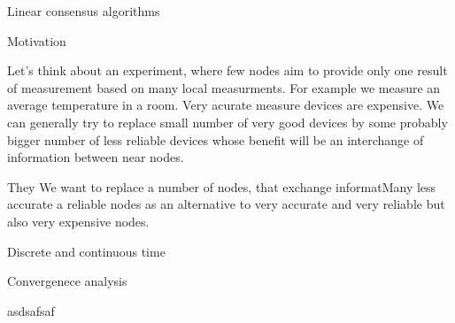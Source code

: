 
\def\ctustyle{{\tenss CTUstyle}}
\def\ttb{\tt\char`\\} %


\chap Linear  consensus algorithms

\sec Motivation

Let's think about an experiment, where few nodes aim to provide only one result of measurement based on many local measurments. For example we measure an average temperature in a room. Very acurate measure devices are expensive. We can generally try to replace small number of very good devices by some probably bigger number of less reliable devices whose benefit will be an interchange of information between near nodes.

 They  We want to replace a number of nodes, that exchange informatMany less accurate a reliable nodes as an alternative to very accurate and very reliable but also very expensive nodes.


\sec Discrete and continuous time

\sec Convergenece analysis


asdsafsaf
